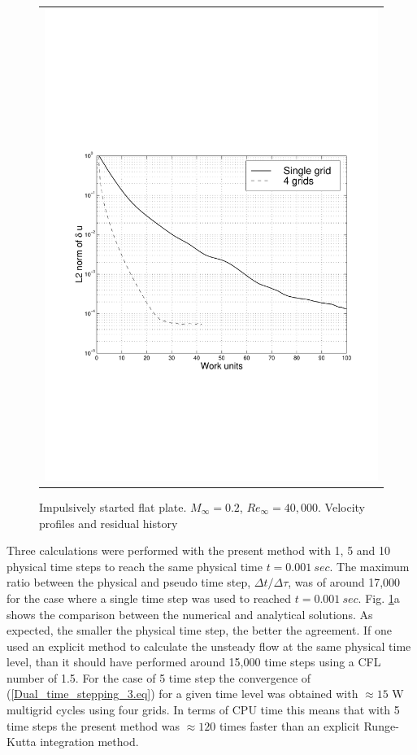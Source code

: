 \begin{figure}
\begin{center}
\begin{tabular}{c}
       {\includegraphics[width=110mm,clip=t]{CHAP_NONLIN/FIGURE/flat_res.pdf}}
  \end{tabular}
 \end{center}
 \vspace{-8mm}
 \caption{Impulsively started flat plate. $M_\infty = 0.2$, $Re_\infty = 40,000$.
          Velocity profiles and residual history}
 \label{flat_impul.fig}
\end{figure}

 Three calculations were performed with the present method with 1, 5 and 10
 physical time steps to reach the same physical time $t = 0.001\ sec$.
 The maximum ratio between the physical and pseudo time step, $\Delta t/\Delta\tau$,
 was of around 17,000 for the case where a single time step was used to reached
 $t = 0.001\ sec$. Fig. \ref{flat_impul.fig}a shows the comparison between
 the numerical and analytical solutions. As expected, the smaller the physical time
 step, the better the agreement.
 If one used an explicit method to calculate the unsteady flow at the same physical
 time level, than it should have performed around 15,000 time steps using
 a CFL number of 1.5. For the case of 5 time step the convergence of
 (\ref{Dual_time_stepping_3.eq}) for a given time level was obtained with $\approx 15$
 W multigrid cycles using four grids. In terms of CPU time this means
 that with 5 time steps the present method was $\approx 120$ times faster than
 an explicit Runge-Kutta integration method.

